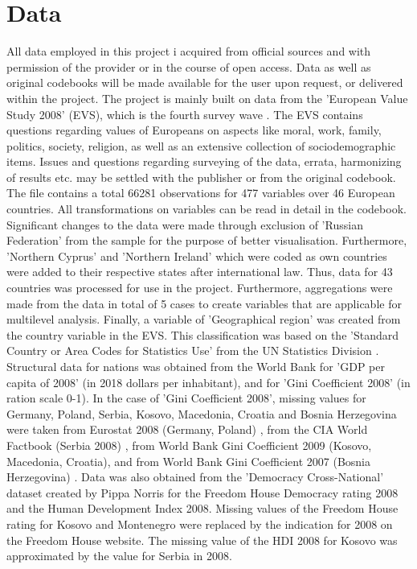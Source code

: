 \documentclass[preprint,12pt,authoryear]{elsarticle}
\begin{document}
	\section{Data}
	All data employed in this project i acquired from official sources and with permission of the provider or in the course of open access. Data as well as original codebooks will be made available for the user upon request, or delivered within the project.
	The project is mainly built on data from the 'European Value Study 2008' (EVS), which is the fourth survey wave \citep{evs_european_2016}. The EVS contains questions regarding values of Europeans on aspects like moral, work, family, politics, society, religion, as well as an extensive collection of sociodemographic items. Issues and questions regarding surveying of the data, errata, harmonizing of results etc. may be settled with the publisher or from the original codebook. The file contains a total 66281 observations for 477 variables over 46 European countries. All transformations on variables can be read in detail in the codebook. Significant changes to the data were made through exclusion of 'Russian Federation' from the sample for the purpose of better visualisation. Furthermore, 'Northern Cyprus' and 'Northern Ireland' which were coded as own countries were added to their respective states after international law. Thus, data for 43 countries was processed for use in the project. Furthermore, aggregations were made from the data in total of 5 cases to create variables that are applicable for multilevel analysis. Finally, a variable of 'Geographical region' was created from the country variable in the EVS. This classification was based on the 'Standard Country or Area Codes for Statistics Use' from the UN Statistics Division \citep{unsd_standard_2019}.
	Structural data for nations was obtained from the World Bank for 'GDP per capita of 2008' (in 2018 dollars per inhabitant)\citep{world_bank_gdp_2019}, and for 'Gini Coefficient 2008' (in ration scale 0-1)\citep{world_bank_gini_2019}. In the case of 'Gini Coefficient 2008', missing values for Germany, Poland, Serbia, Kosovo, Macedonia, Croatia and Bosnia Herzegovina were taken from Eurostat 2008 (Germany, Poland) \citep{eurostat_eurostat_2019}, from the CIA World Factbook (Serbia 2008) \citep{central_intelligence_agency_serbia_2019}, from World Bank Gini Coefficient 2009 (Kosovo, Macedonia, Croatia), and from World Bank Gini Coefficient 2007 (Bosnia Herzegovina) \citep{world_bank_gini_2019}. Data was also obtained from the 'Democracy Cross-National' dataset created by Pippa Norris \citep{norris_data_2015} for the Freedom House Democracy rating 2008 and the Human Development Index 2008. Missing values of the Freedom House rating for Kosovo \citep{freedom_house_kosovo_2012} and Montenegro \citep{freedom_house_montenegro_2012} were replaced by the indication for 2008 on the Freedom House website. The missing value of the HDI 2008 for Kosovo was approximated by the value for Serbia in 2008.
	
\end{document}

